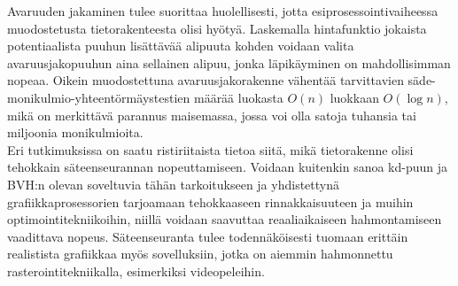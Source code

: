 ﻿\documentclass[a4paper, 12pt, titlepage]{article}
\begin{document}
Avaruuden jakaminen tulee suorittaa huolellisesti, jotta esiprosessointivaiheessa muodostetusta tietorakenteesta olisi hyötyä. Laskemalla hintafunktio jokaista potentiaalista puuhun lisättävää alipuuta kohden voidaan valita avaruusjakopuuhun aina sellainen alipuu, jonka läpikäyminen on mahdollisimman nopeaa. Oikein muodostettuna avaruusjakorakenne vähentää tarvittavien säde-monikulmio-yhteentörmäystestien määrää luokasta $O(n)$ luokkaan $O(\log n)$, mikä on merkittävä parannus maisemassa, jossa voi olla satoja tuhansia tai miljoonia monikulmioita. \\

Eri tutkimuksissa on saatu ristiriitaista tietoa siitä, mikä tietorakenne olisi tehokkain säteenseurannan nopeuttamiseen. Voidaan kuitenkin sanoa kd-puun ja BVH:n olevan soveltuvia tähän tarkoitukseen ja yhdistettynä grafiikkaprosessorien tarjoamaan tehokkaaseen rinnakkaisuuteen ja muihin optimointitekniikoihin, niillä voidaan saavuttaa reaaliaikaiseen hahmontamiseen vaadittava nopeus. Säteenseuranta tulee todennäköisesti tuomaan erittäin realistista grafiikkaa myös sovelluksiin, jotka on aiemmin hahmonnettu rasterointitekniikalla, esimerkiksi videopeleihin. \\



\clearpage

\clearpage
\listofalgorithms
\end{document}
